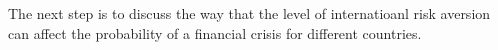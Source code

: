 \documentclass[12pt, a4paper, oneside]{article} %
\begin{document}
The next step is to discuss the way that the level of internatioanl risk aversion can affect the probability of a financial crisis for different countries. 
\end{document}
